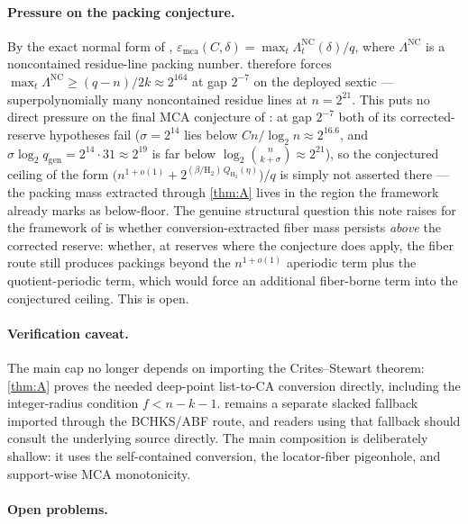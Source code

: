 \documentclass[11pt]{article}
\theoremstyle{definition}
\theoremstyle{remark}
\newcommand{\emca}{\varepsilon_{\mathrm{mca}}}
\newcommand{\Hb}{\mathrm{H}_2}
\begin{document}
\paragraph{Pressure on the packing conjecture.}
By the exact normal form of \cite{Cho26b}, $\emca(C,\delta)=\max_t\Lambda^{\mathrm{NC}}_t(\delta)/q$, where $\Lambda^{\mathrm{NC}}$ is a noncontained residue-line packing number.  therefore forces $\max_t\Lambda^{\mathrm{NC}}\ge(q-n)/2k\approx2^{164}$ at gap $2^{-7}$ on the deployed sextic --- superpolynomially many noncontained residue lines at $n=2^{21}$. This puts no direct pressure on the final MCA conjecture of \cite[Conj.\ ``Final floor- and quotient-corrected MCA asymptotic'']{Cho26b}: at gap $2^{-7}$ both of its corrected-reserve hypotheses fail ($\sigma=2^{14}$ lies below $Cn/\log_2n\approx2^{16.6}$, and $\sigma\log_2 q_{\mathrm{gen}}=2^{14}\cdot31\approx2^{19}$ is far below $\log_2\binom n{k+\sigma}\approx2^{21}$), so the conjectured ceiling of the form $\bigl(n^{1+o(1)}+2^{(\beta/\Hb)\,Q_{\Hb}(\eta)}\bigr)/q$ is simply not asserted there --- the packing mass extracted through \cref{thm:A} lives in the region the framework already marks as below-floor. The genuine structural question this note raises for the framework of \cite{Cho26b} is whether conversion-extracted fiber mass persists \emph{above} the corrected reserve: whether, at reserves where the conjecture does apply, the fiber route still produces packings beyond the $n^{1+o(1)}$ aperiodic term plus the quotient-periodic term, which would force an additional fiber-borne term into the conjectured ceiling. This is open.

\paragraph{Verification caveat.}
The main cap no longer depends on importing the Crites--Stewart theorem: \cref{thm:A} proves the needed deep-point list-to-CA conversion directly, including the integer-radius condition $f<n-k-1$.   remains a separate slacked fallback imported through the BCHKS/ABF route, and readers using that fallback should consult the underlying source directly.  The main composition is deliberately shallow: it uses the self-contained conversion, the locator-fiber pigeonhole, and support-wise MCA monotonicity.

\paragraph{Open problems.}
\end{document}
